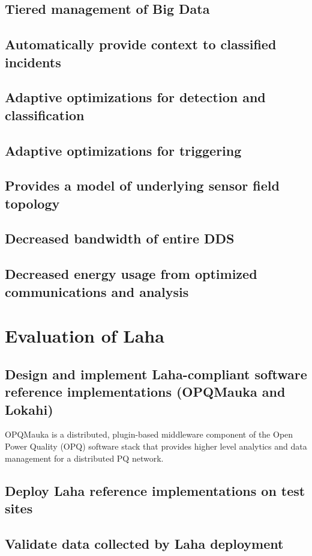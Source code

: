 \subsection{Tiered management of Big Data}
\subsection{Automatically provide context to classified incidents}
\subsection{Adaptive optimizations for detection and classification}
\subsection{Adaptive optimizations for triggering}
\subsection{Provides a model of underlying sensor field topology}
\subsection{Decreased bandwidth of entire DDS}
\subsection{Decreased energy usage from optimized communications and analysis}

\section{Evaluation of Laha}
\subsection{Design and implement Laha-compliant software reference implementations (OPQMauka and Lokahi)}
OPQMauka is a distributed, plugin-based middleware component of the Open Power Quality (OPQ) software stack that provides higher level analytics and data management for a distributed PQ network.

\subsection{Deploy Laha reference implementations on test sites}
\subsection{Validate data collected by Laha deployment}
